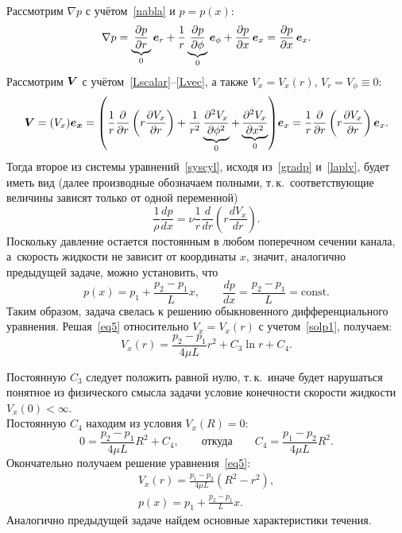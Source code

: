 \documentclass[12pt, a4paper]{article}
\renewcommand{\vec}[1]{\bi{#1}}
\begin{document}
Рассмотрим $\nabla p$ с учётом~\eqref{nabla} и $p=p(x)$:
\begin{equation}
\label{gradp}
	\nabla p=\underbrace{\frac{\partial p}{\partial r}}_0\vec e_r+\frac{1}{r}\underbrace{\frac{\partial p}{\partial \phi}}_0\vec e_{\phi} + \frac{\partial p}{\partial x}\,\vec e_x=\frac{\partial p}{\partial x}\,\vec e_x.
\end{equation}
Рассмотрим $\Delta\vec V$ с учётом~\eqref{Lscalar}--\eqref{Lvec}, а также   $V_x=V_x(r)$, $V_r=V_{\phi}\equiv 0$:
\begin{equation}
\label{laplv}
	\Delta\vec V= (\Delta V_x)\vec {e_x}=
\left(\frac{1}{r}\frac{\partial}{\partial r}\left(r\frac{\partial V_x}{\partial r}\right)+\frac{1}{r^2}\underbrace{\frac{\partial^2 V_x}{\partial {\phi^2}}}_0+\underbrace{\frac{\partial^2 V_x}{\partial {x^2}}}_0\right)\!\vec e_x=\frac{1}{r}\frac{\partial}{\partial r}\left(r\frac{\partial V_x}{\partial r}\right) \vec e_x.
\end{equation}
Тогда второе из системы уравнений~\eqref{syscyl}, исходя из~\eqref{gradp} и~\eqref{laplv}, будет иметь вид (далее производные обозначаем полными, т.\,к.\ соответствующие величины зависят только от одной переменной)
\begin{equation}\label{eq5}
	\frac{1}{\rho}\frac{dp}{dx}=\nu\frac{1}{r}\frac{d}{dr}\left(r\frac{dV_x}{dr}\right).
\end{equation}
Поскольку давление остается постоянным в любом поперечном сечении канала, а~скорость жидкости не зависит от координаты $x$, значит, аналогично предыдущей задаче, можно установить, что
\begin{equation}
\label{solp1}
p(x) = p_1 + \frac{p_2-p_1}{L}x, \qquad \frac{dp}{dx}=\frac{p_2-p_1}{L} = \mathrm{const}.
\end{equation}
Таким образом, задача свелась к решению обыкновенного дифференциального уравнения.
Решая~\eqref{eq5} относительно $V_x=V_x(r)$ с учетом~\eqref{solp1}, получаем:
\begin{equation*}
V_x(r)=\frac{p_2-p_1}{4\mu L}r^2+C_3\ln{r}+C_4.
\end{equation*}

Постоянную $C_3$ следует положить равной нулю, т.\,к.\ иначе будет нарушаться понятное из физического смысла задачи условие конечности скорости жидкости $V_x(0)<\infty$.\\

Постоянную $C_4$ находим из условия $V_x(R)=0$:
\begin{equation*}
0=\frac{p_2-p_1}{4\mu L}R^2+C_4,\qquad\mbox{откуда}\qquad C_4=\frac{p_1-p_2}{4\mu L}R^2.
\end{equation*}
Окончательно получаем решение уравнения~\eqref{eq5}:
\begin{gather}
V_x(r)=\frac{p_1-p_2}{4\mu L}(R^2-r^2),\\
p(x) = p_1 + \frac{p_2-p_1}{L}x.
\end{gather}
Аналогично предыдущей задаче найдем основные характеристики течения.
\end{document}
